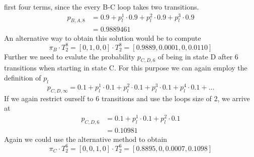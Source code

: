 \documentclass{article}
\begin{document}
first four terms, since the every B-C loop takes two transitions.
\begin{align}
	p_{B,A,8} 	&= 0.9 + p_l^1 \cdot 0.9 + p_l^2 \cdot 0.9 + p_l^3 \cdot 0.9 \\
				&= 0.9889461
\end{align}
An alternative way to obtain this solution would be to compute
\begin{equation}
	\pi_B \cdot T_2^8 = [0, 1, 0, 0] \cdot T_2^8 = [0.9889, 0.0001, 0, 0.0110]
\end{equation}
Further we need to evalute the probability $p_{C,D,6}$ of being in state D after 6 
transitions when starting in state C. For this purpose we can again employ the
definition of $p_l$
\begin{equation}
	p_{C,D,\infty} = 0.1 + p_l^1 \cdot 0.1 + p_l^2 \cdot 0.1 + 
						p_l^3 \cdot 0.1 + p_l^4 \cdot 0.1 + \ldots
\end{equation}
If we again restrict ourself to 6 transitions and use the loops size of 2, we arrive at
\begin{align}
	p_{C,D,6} &= 0.1 + p_l^1 \cdot 0.1 + p_l^2 \cdot 0.1 \\
				&= 0.10981
\end{align}
Again we could use the alternative method to obtain
\begin{equation}
	\pi_C \cdot T_2^6 = [0, 0, 1, 0] \cdot T_2^6 = [ 0.8895,  0, 0.0007, 0.1098]
\end{equation}
\end{document}
